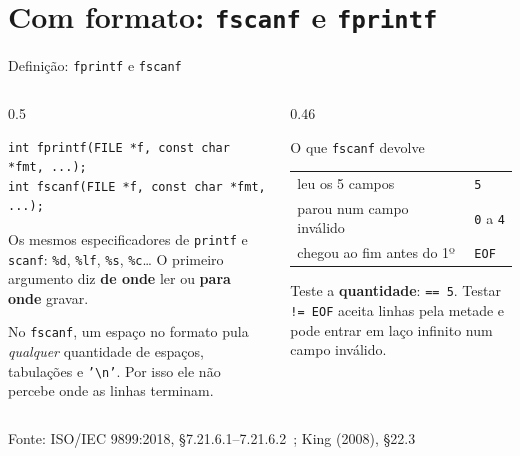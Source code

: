 \documentclass[aspectratio=169]{beamer}
\newcommand{\fonte}[1]{\vfill\hfill{\scriptsize\textcolor{UFSGray}{Fonte: #1}}}
\begin{document}
\section{Com formato: \texttt{fscanf} e \texttt{fprintf}}

\begin{frame}[fragile]{Definição: \texttt{fprintf} e \texttt{fscanf}}
  \vspace{-0.3em}
  \begin{columns}[T]
    \begin{column}{0.5\textwidth}
\begin{lstlisting}[style=codC]
int fprintf(FILE *f, const char *fmt, ...);
int fscanf(FILE *f, const char *fmt, ...);
\end{lstlisting}
      \small Os mesmos especificadores de \texttt{printf} e \texttt{scanf}:
      \texttt{\%d}, \texttt{\%lf}, \texttt{\%s}, \texttt{\%c}\ldots{} O
      primeiro argumento diz \textbf{de onde} ler ou \textbf{para onde}
      gravar.

      \medskip
      No \texttt{fscanf}, um espaço no formato pula \emph{qualquer}
      quantidade de espaços, tabulações e \texttt{'\textbackslash n'}. Por
      isso ele não percebe onde as linhas terminam.
    \end{column}
    \begin{column}{0.46\textwidth}
      \begin{block}{O que \texttt{fscanf} devolve}
        \scriptsize
        \begin{tabular}{@{}p{2.6cm}l@{}}
          leu os 5 campos & \texttt{5}\\
          parou num campo inválido & \texttt{0} a \texttt{4}\\
          chegou ao fim antes do 1º & \texttt{EOF}\\
        \end{tabular}
      \end{block}
      \small Teste a \textbf{quantidade}: \texttt{== 5}. Testar
      \texttt{!= EOF} aceita linhas pela metade e pode entrar em laço
      infinito num campo inválido.
    \end{column}
  \end{columns}
  \fonte{ISO/IEC 9899:2018, §7.21.6.1--7.21.6.2~\cite{iso2018c17};
    King (2008), §22.3~\cite{king2008c}}
\end{frame}
\end{document}
